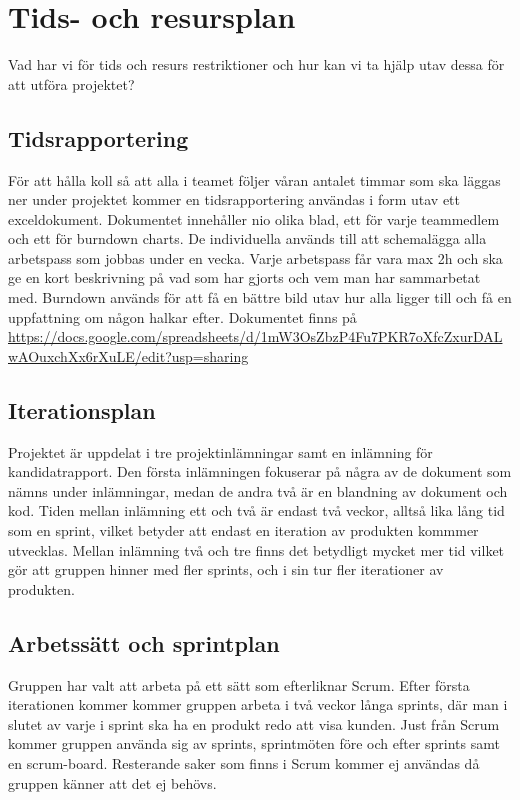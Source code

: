 \section{Tids- och resursplan}
Vad har vi för tids och resurs restriktioner och hur kan vi ta hjälp utav dessa för att utföra
projektet?

\subsection{Tidsrapportering}
För att hålla koll så att alla i teamet följer våran antalet timmar som ska läggas ner under
projektet kommer en tidsrapportering användas i form utav ett exceldokument. Dokumentet
innehåller nio olika blad, ett för varje teammedlem och ett för burndown charts.
De individuella används till att schemalägga alla arbetspass som jobbas under en vecka.
Varje arbetspass får vara max 2h och ska ge en kort beskrivning på vad som har gjorts och vem
man har sammarbetat med. Burndown används för att få en bättre bild utav hur alla ligger till
och få en uppfattning om någon halkar efter.
Dokumentet finns på \url{https://docs.google.com/spreadsheets/d/1mW3OsZbzP4Fu7PKR7oXfcZxurDALwAOuxchXx6rXuLE/edit?usp=sharing}


\subsection{Iterationsplan}
Projektet är uppdelat i tre projektinlämningar samt en inlämning för kandidatrapport. Den första inlämningen fokuserar på några av de dokument som nämns under inlämningar, medan de andra två är en blandning av dokument och kod. Tiden mellan inlämning ett och två är endast två veckor, alltså lika lång tid som en sprint, vilket betyder att endast en iteration av produkten kommmer utvecklas. Mellan inlämning två och tre finns det betydligt mycket mer tid vilket gör att gruppen hinner med fler sprints, och i sin tur fler iterationer av produkten.

\subsection{Arbetssätt och sprintplan}
Gruppen har valt att arbeta på ett sätt som efterliknar Scrum. Efter första iterationen kommer kommer gruppen arbeta i två veckor långa sprints, där man i slutet av varje i sprint ska ha en produkt redo att visa kunden. Just från Scrum kommer gruppen använda sig av sprints, sprintmöten före och efter sprints samt en scrum-board. Resterande saker som finns i Scrum kommer ej användas då gruppen känner att det ej behövs.

